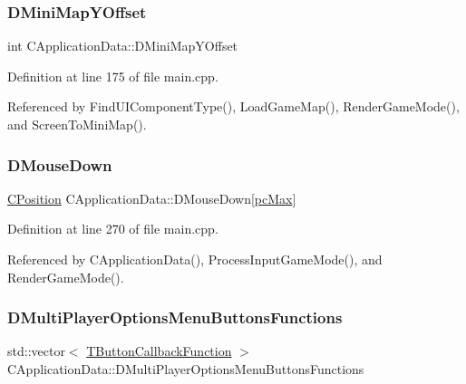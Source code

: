 \subsubsection{\texorpdfstring{D\+Mini\+Map\+Y\+Offset}{DMiniMapYOffset}}
{\footnotesize\ttfamily int C\+Application\+Data\+::\+D\+Mini\+Map\+Y\+Offset\hspace{0.3cm}{\ttfamily [protected]}}



Definition at line 175 of file main.\+cpp.



Referenced by Find\+U\+I\+Component\+Type(), Load\+Game\+Map(), Render\+Game\+Mode(), and Screen\+To\+Mini\+Map().

\hypertarget{classCApplicationData_ad7a43a29e7906e44f09347850796a915}{}\label{classCApplicationData_ad7a43a29e7906e44f09347850796a915} 
\subsubsection{\texorpdfstring{D\+Mouse\+Down}{DMouseDown}}
{\footnotesize\ttfamily \hyperlink{classCPosition}{C\+Position} C\+Application\+Data\+::\+D\+Mouse\+Down\mbox{[}\hyperlink{GameDataTypes_8h_aafb0ca75933357ff28a6d7efbdd7602fa594a5c8dd3987f24e8a0f23f1a72cd34}{pc\+Max}\mbox{]}\hspace{0.3cm}{\ttfamily [protected]}}



Definition at line 270 of file main.\+cpp.



Referenced by C\+Application\+Data(), Process\+Input\+Game\+Mode(), and Render\+Game\+Mode().

\hypertarget{classCApplicationData_ad32d3cc90fd1ead1574cb6c336257e1c}{}\label{classCApplicationData_ad32d3cc90fd1ead1574cb6c336257e1c} 
\subsubsection{\texorpdfstring{D\+Multi\+Player\+Options\+Menu\+Buttons\+Functions}{DMultiPlayerOptionsMenuButtonsFunctions}}
{\footnotesize\ttfamily std\+::vector$<$ \hyperlink{main_8cpp_af91bc223ea3fea871af009bfef33c595}{T\+Button\+Callback\+Function} $>$ C\+Application\+Data\+::\+D\+Multi\+Player\+Options\+Menu\+Buttons\+Functions\hspace{0.3cm}{\ttfamily [protected]}}



